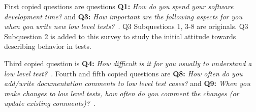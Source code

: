 First copied questions are questions \textbf{Q1:} \textit{How do you spend your software development time?} and
\textbf{Q3:} \textit{How important are the following aspects for you when you write new low level tests?}~\cite{daka2014survey}.
Q3 Subquestions 1, 3-8 are originals. Q3 Subquestion 2 is added to this survey to study the initial attitude towards describing behavior
in tests.

Third copied question is \textbf{Q4:} \textit{How difficult is it for you usually to understand a low level test?}~\cite{li2016automatically}. Fourth and fifth
copied questions are \textbf{Q8:} \textit{How often do you add/write documentation comments to low level test cases?} and
\textbf{Q9:} \textit{When you make changes to low level tests, how often do you comment the changes (or update existing comments)?}~\cite{li2016automatically}.
\clearpage
{}
